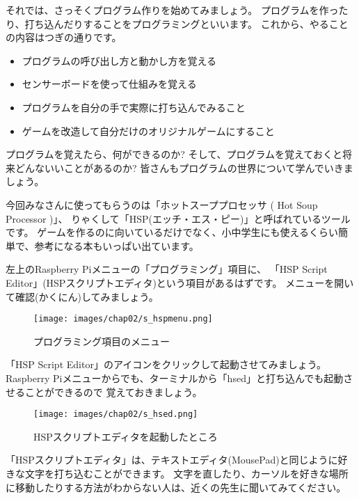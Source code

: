 それでは、さっそくプログラム作りを始めてみましょう。
プログラムを作ったり、打ち込んだりすることをプログラミングといいます。
これから、やることの内容はつぎの通りです。

\begin{itemize}
  \item プログラムの呼び出し方と動かし方を覚える
  \item センサーボードを使って仕組みを覚える
  \item プログラムを自分の手で実際に打ち込んでみること
  \item ゲームを改造して自分だけのオリジナルゲームにすること
\end{itemize}

プログラムを覚えたら、何ができるのか?
そして、プログラムを覚えておくと将来どんないいことがあるのか?
皆さんもプログラムの世界について学んでいきましょう。

今回みなさんに使ってもらうのは「ホットスーププロセッサ ( Hot Soup Processor )」、
りゃくして「HSP(エッチ・エス・ピー)」と呼ばれているツールです。
ゲームを作るのに向いているだけでなく、小中学生にも使えるくらい簡単で、参考になる本もいっぱい出ています。

左上のRaspberry Piメニューの「プログラミング」項目に、
「HSP Script Editor」(HSPスクリプトエディタ)という項目があるはずです。
メニューを開いて確認(かくにん)してみましょう。

\begin{figure}[H]
  \begin{center}
    \texttt{[image: images/chap02/s\_hspmenu.png]}
    \caption{プログラミング項目のメニュー}
  \end{center}
  \label{fig:hsp_menu}
\end{figure}

「HSP Script Editor」のアイコンをクリックして起動させてみましょう。
Raspberry Piメニューからでも、ターミナルから「hsed」と打ち込んでも起動させることができるので
覚えておきましょう。

\begin{figure}[H]
  \begin{center}
    \texttt{[image: images/chap02/s\_hsed.png]}
    \caption{HSPスクリプトエディタを起動したところ}
  \end{center}
  \label{fig:hsed_start}
\end{figure}

「HSPスクリプトエディタ」は、テキストエディタ(MousePad)と同じように好きな文字を打ち込むことができます。
文字を直したり、カーソルを好きな場所に移動したりする方法がわからない人は、近くの先生に聞いてみてください。

